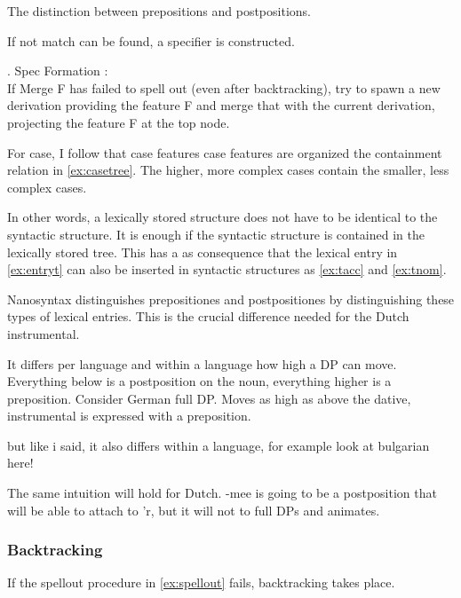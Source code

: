 \documentclass[12pt]{article}
\begin{document}
The distinction between prepositions and postpositions.



If not match can be found, a specifier is constructed.

\ex. Spec Formation \citep{starke2018}:\\
If Merge F has failed to spell out (even after backtracking), try to spawn a new derivation providing the feature F and merge that with the current derivation, projecting the feature F at the top node.

For case, I follow \citet{caha2009} that case features case features are organized the containment relation in \ref{ex:casetree}. The higher, more complex cases contain the smaller, less complex cases.



In other words, a lexically stored structure does not have to be identical to the syntactic structure. It is enough if the syntactic structure is contained in the lexically stored tree. This has a as consequence that the lexical entry in \ref{ex:entryt} can also be inserted in syntactic structures as \ref{ex:tacc} and \ref{ex:tnom}.



Nanosyntax distinguishes prepositiones and postpositiones by distinguishing these types of lexical entries. This is the crucial difference needed for the Dutch instrumental.

It differs per language and within a language how high a DP can move. Everything below is a postposition on the noun, everything higher is a preposition. Consider German full DP. Moves as high as above the dative, instrumental is expressed with a preposition.

but like i said, it also differs within a language, for example look at bulgarian here!





The same intuition will hold for Dutch.
-mee is going to be a postposition that will be able to attach to 'r, but it will not to full DPs and animates.








\subsubsection{Backtracking}

If the spellout procedure in \ref{ex:spellout} fails, backtracking takes place.
\end{document}
